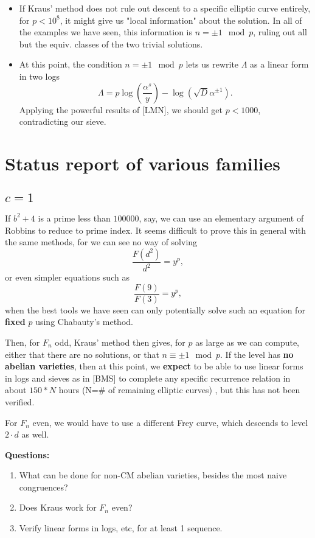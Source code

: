 \documentclass[12pt]{article}
\begin{document}
\begin{enumerate}
\begin{itemize}
\item If Kraus' method does not rule out descent to a specific elliptic curve entirely, for $p < 10^8$, it might give us "local information" about the solution. In all of the examples we have seen, this information is $n = \pm 1 \mod p$, ruling out all but the equiv. classes of the two trivial solutions.
\item At this point, the condition $n = \pm 1 \mod p$ lets us rewrite $\Lambda$ as a linear form in two logs 
\[ \Lambda = p \log(\frac{\alpha^s}{y}) -  \log(\sqrt{D}\alpha^{\pm 1}). \]
Applying the powerful results of [LMN], we should get $p < 1000$, contradicting our sieve.
\end{itemize}
\end{enumerate}

\section{Status report of various families}
\subsection{$c=1$}

If $b^2+4$ is a prime less than $100000$, say, we can use an elementary argument of Robbins to reduce to prime index. It seems difficult to prove this in general with the same methods, for we can see no way of solving
\[\frac{F(d^2)}{d^2} = y^p, \]
or even simpler equations such as
\[\frac{F(9)}{F(3)} = y^p,\]
when the best tools we have seen can only potentially solve such an equation for \textbf{fixed} $p$ using Chabauty's method.

Then, for $F_n$ odd, Kraus' method then gives, for $p$ as large as we can compute, either that there are no solutions, or that $n \equiv \pm 1 \mod p$. If the level has \textbf{no abelian varieties}, then at this point, we \textbf{expect} to be able to use linear forms in logs and sieves as in [BMS] to complete any specific recurrence relation in about $150*N$ hours (N=\# of remaining elliptic curves) , but this has not been verified.

For $F_n$ even, we would have to use a different Frey curve, which descends to level $2\cdot d$ as well.

\textbf{Questions:}
\begin{enumerate}
\item What can be done for non-CM abelian varieties, besides the most naive congruences?
\item Does Kraus work for $F_n$ even?
\item Verify linear forms in logs, etc, for at least 1 sequence.
\end{enumerate}
\end{document}

